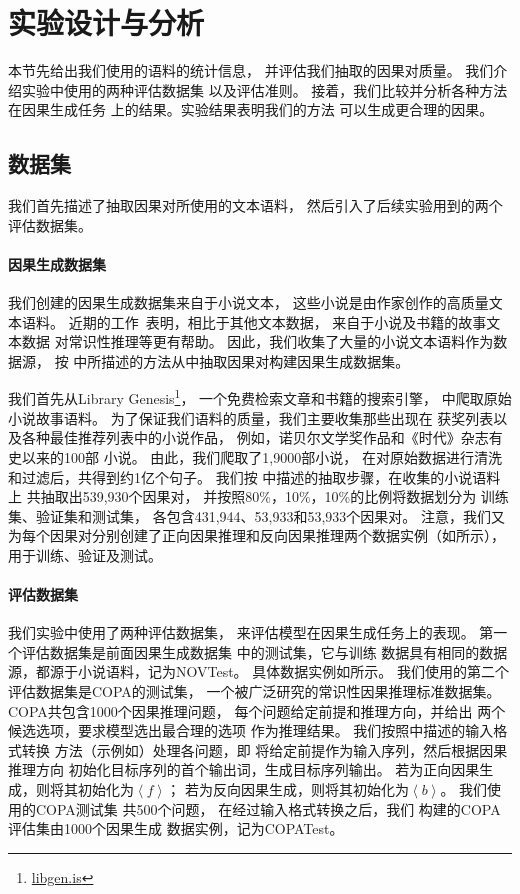\section{实验设计与分析}
\label{sec:causalgen-experiment}
本节先给出我们使用的语料的统计信息，
并评估我们抽取的因果对质量。
我们介绍实验中使用的两种评估数据集
以及评估准则。
接着，我们比较并分析各种方法在因果生成任务
上的结果。实验结果表明我们的方法
可以生成更合理的因果。

\subsection{数据集}
\label{sec:causalgen-datasets}
我们首先描述了抽取因果对所使用的文本语料，
然后引入了后续实验用到的两个评估数据集。

\paragraph{因果生成数据集}
\label{sec:causalgen-corpus}
我们创建的因果生成数据集来自于小说文本，
这些小说是由作家创作的高质量文本语料。
近期的工作~\cite{}表明，相比于其他文本数据，
来自于小说及书籍的故事文本数据
对常识性推理等更有帮助。
因此，我们收集了大量的小说文本语料作为数据源，
按
中所描述的方法从中抽取因果对构建因果生成数据集。

\noindent 我们首先从Library Genesis\footnote{\url{libgen.is}}，
一个免费检索文章和书籍的搜索引擎，
中爬取原始小说故事语料。
为了保证我们语料的质量，我们主要收集那些出现在
获奖列表以及各种最佳推荐列表中的小说作品，
例如，诺贝尔文学奖作品和《时代》杂志有史以来的100部
小说。
由此，我们爬取了1,9000部小说，
在对原始数据进行清洗和过滤后，共得到约1亿个句子。
我们按
中描述的抽取步骤，在收集的小说语料上
共抽取出539,930个因果对，
并按照80\%，10\%，10\%的比例将数据划分为
训练集、验证集和测试集，
各包含431,944、53,933和53,933个因果对。
注意，我们又为每个因果对分别创建了正向因果推理和反向因果推理两个数据实例（如所示），用于训练、验证及测试。

\paragraph{评估数据集}
\label{sec:causalgen-eval-dataset}
我们实验中使用了两种评估数据集，
来评估模型在因果生成任务上的表现。
第一个评估数据集是前面因果生成数据集
中的测试集，它与训练
数据具有相同的数据源，都源于小说语料，记为NOVTest。
具体数据实例如所示。
我们使用的第二个评估数据集是COPA的测试集，
一个被广泛研究的常识性因果推理标准数据集。
COPA共包含1000个因果推理问题，
每个问题给定前提和推理方向，并给出
两个候选选项，要求模型选出最合理的选项
作为推理结果。
我们按照中描述的输入格式转换
方法（示例如）处理各问题，即
将给定前提作为输入序列，然后根据因果推理方向
初始化目标序列的首个输出词，生成目标序列输出。
若为正向因果生成，则将其初始化为$\left< f\right>$；
若为反向因果生成，则将其初始化为$\left< b\right>$。
我们使用的COPA测试集
共500个问题，
在经过输入格式转换之后，我们
构建的COPA评估集由1000个因果生成
数据实例，记为COPATest。

